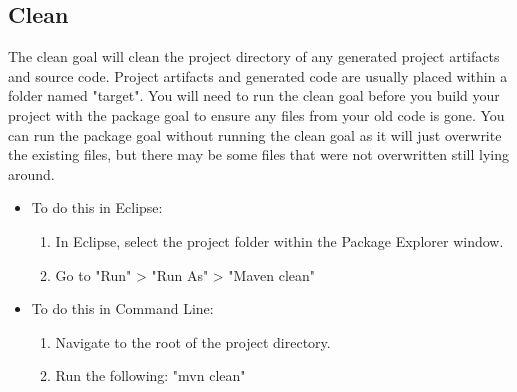 \documentclass{article}
\begin{document}
\subsection*{Clean}
The clean goal will clean the project directory of any generated project artifacts and source code. Project artifacts and generated code are usually placed within a folder named "target". You will need to run the clean goal before you build your project with the package goal to ensure any files from your old code is gone. You can run the package goal without running the clean goal as it will just overwrite the existing files, but there may be some files that were not overwritten still lying around.
\begin{itemize}
\item To do this in Eclipse:
	\begin{enumerate}
	\item In Eclipse, select the project folder within the Package Explorer window.
	\item Go to "Run" > "Run As" > "Maven clean"
	\end{enumerate}
\item To do this in Command Line:
	\begin{enumerate}
	\item Navigate to the root of the project directory.
	\item Run the following: "mvn clean"
	\end{enumerate}
\end{itemize}

\end{document}
